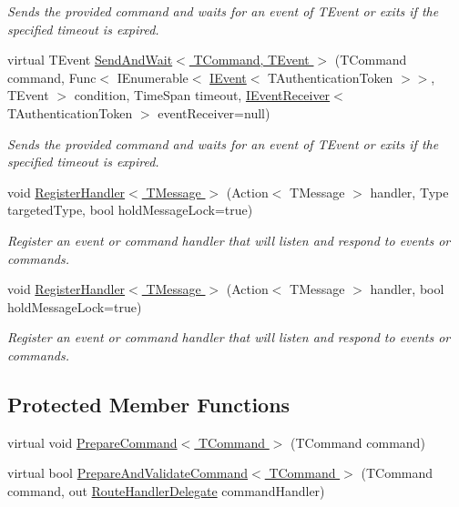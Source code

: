 \begin{DoxyCompactItemize}
\begin{DoxyCompactList}\small\item\em Sends the provided {\itshape command}  and waits for an event of {\itshape T\+Event}  or exits if the specified timeout is expired. \end{DoxyCompactList}\item 
virtual T\+Event \hyperlink{classCqrs_1_1Akka_1_1Commands_1_1AkkaCommandBus_a0bd9b9e4522286eba7af71d3ab400d5f_a0bd9b9e4522286eba7af71d3ab400d5f}{Send\+And\+Wait$<$ T\+Command, T\+Event $>$} (T\+Command command, Func$<$ I\+Enumerable$<$ \hyperlink{interfaceCqrs_1_1Events_1_1IEvent}{I\+Event}$<$ T\+Authentication\+Token $>$$>$, T\+Event $>$ condition, Time\+Span timeout, \hyperlink{interfaceCqrs_1_1Events_1_1IEventReceiver}{I\+Event\+Receiver}$<$ T\+Authentication\+Token $>$ event\+Receiver=null)
\begin{DoxyCompactList}\small\item\em Sends the provided {\itshape command}  and waits for an event of {\itshape T\+Event}  or exits if the specified timeout is expired. \end{DoxyCompactList}\item 
void \hyperlink{classCqrs_1_1Akka_1_1Commands_1_1AkkaCommandBus_a8ed33fb315493d52470bc3bc2bf076f2_a8ed33fb315493d52470bc3bc2bf076f2}{Register\+Handler$<$ T\+Message $>$} (Action$<$ T\+Message $>$ handler, Type targeted\+Type, bool hold\+Message\+Lock=true)
\begin{DoxyCompactList}\small\item\em Register an event or command handler that will listen and respond to events or commands. \end{DoxyCompactList}\item 
void \hyperlink{classCqrs_1_1Akka_1_1Commands_1_1AkkaCommandBus_adc21072d2b02c745747c4d585a53dba3_adc21072d2b02c745747c4d585a53dba3}{Register\+Handler$<$ T\+Message $>$} (Action$<$ T\+Message $>$ handler, bool hold\+Message\+Lock=true)
\begin{DoxyCompactList}\small\item\em Register an event or command handler that will listen and respond to events or commands. \end{DoxyCompactList}\end{DoxyCompactItemize}
\subsection*{Protected Member Functions}
\begin{DoxyCompactItemize}
\item 
virtual void \hyperlink{classCqrs_1_1Akka_1_1Commands_1_1AkkaCommandBus_a9755a84c0b971ce0862abdc2783422ce_a9755a84c0b971ce0862abdc2783422ce}{Prepare\+Command$<$ T\+Command $>$} (T\+Command command)
\item 
virtual bool \hyperlink{classCqrs_1_1Akka_1_1Commands_1_1AkkaCommandBus_ae3e5f1725bceb0359aedb74ded530858_ae3e5f1725bceb0359aedb74ded530858}{Prepare\+And\+Validate\+Command$<$ T\+Command $>$} (T\+Command command, out \hyperlink{classCqrs_1_1Bus_1_1RouteHandlerDelegate}{Route\+Handler\+Delegate} command\+Handler)
\end{DoxyCompactItemize}
